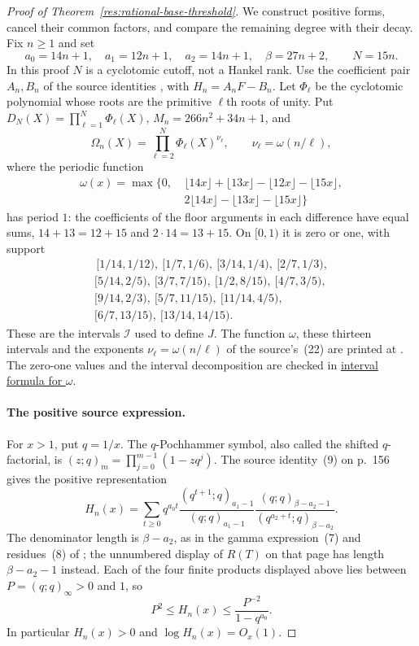 \documentclass[11pt]{article}
\begin{document}
\begin{proof}[Proof of Theorem~\ref{res:rational-base-threshold}]
We construct positive forms, cancel their common factors, and compare
the remaining degree with their decay. Fix $n\ge1$ and set
\[
 a_0=14n+1,\quad a_1=12n+1,\quad a_2=14n+1,\quad\beta=27n+2,
 \qquad N=15n.
\]
In this proof $N$ is a cyclotomic cutoff, not a Hankel rank.
Use the coefficient pair $A_n,B_n$ of the source identities
\cite[(8)--(11), pp.~156--157]{zudilin2004}, with $H_n=A_nF-B_n$.
Let $\Phi_\ell$ be the cyclotomic polynomial whose roots are the primitive
$\ell$th roots of unity. Put $D_N(X)=\prod_{\ell=1}^{N}\Phi_\ell(X)$,
$M_n=266n^2+34n+1$, and
\[
 \Omega_n(X)=\prod_{\ell=2}^{N}\Phi_\ell(X)^{\nu_\ell},
 \qquad \nu_\ell=\omega(n/\ell),
\]
where the periodic function
\[
\begin{split}
\omega(x)=\max\{0,&\ \lfloor14x\rfloor+\lfloor13x\rfloor
                  -\lfloor12x\rfloor-\lfloor15x\rfloor,\\
                &\ 2\lfloor14x\rfloor-\lfloor13x\rfloor
                  -\lfloor15x\rfloor\}
\end{split}
\]
has period $1$: the coefficients of the floor arguments in each
difference have equal sums, $14+13=12+15$ and $2\cdot14=13+15$.
On $[0,1)$ it is zero or one, with support
\[
\begin{gathered}
\,[1/14,1/12),\ [1/7,1/6),\ [3/14,1/4),\ [2/7,1/3),\\
[5/14,2/5),\ [3/7,7/15),\ [1/2,8/15),\ [4/7,3/5),\\
[9/14,2/3),\ [5/7,11/15),\ [11/14,4/5),\\
[6/7,13/15),\ [13/14,14/15).
\end{gathered}
\]
These are the intervals $\mathcal I$ used to define $J$.
The function $\omega$, these thirteen intervals and the exponents
$\nu_\ell=\omega(n/\ell)$ of the source's~(22) are printed at
\cite[pp.~161--162]{zudilin2004}.
The zero-one values and the interval decomposition are checked in
\href{https://github.com/wcook04/plectis-erdos/blob/f36a98bf3d3e6f65f1074e3b800e3293d5b8a51a/ErdosProblems/Erdos1049/PaperOmegaIndicatorR7.lean#L1297}{interval formula for $\omega$}.

\paragraph{The positive source expression.}
For $x>1$, put $q=1/x$. The $q$-Pochhammer symbol, also called the
shifted $q$-factorial, is $(z;q)_m=\prod_{j=0}^{m-1}(1-zq^j)$.
The source identity~(9) on
p.~156 gives the positive representation
\[
 H_n(x)=\sum_{t\ge0}q^{a_0t}
 \frac{(q^{t+1};q)_{a_1-1}}{(q;q)_{a_1-1}}
 \frac{(q;q)_{\beta-a_2-1}}{(q^{a_2+t};q)_{\beta-a_2}}.
\]
The denominator length is $\beta-a_2$, as in the gamma expression~(7)
and residues~(8) of \cite[p.~156]{zudilin2004}; the unnumbered display
of $R(T)$ on that page has length $\beta-a_2-1$ instead.
Each of the four finite products displayed above lies between
$P=(q;q)_\infty>0$ and $1$, so
\[
 P^2\le H_n(x)\le\frac{P^{-2}}{1-q^{a_0}}.
\]
In particular $H_n(x)>0$ and $\log H_n(x)=O_x(1)$.


\end{proof}
\end{document}
